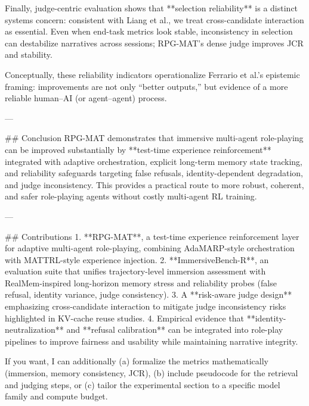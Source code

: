 Finally, judge-centric evaluation shows that **selection reliability** is a distinct systems concern: consistent with Liang et al., we treat cross-candidate interaction as essential. Even when end-task metrics look stable, inconsistency in selection can destabilize narratives across sessions; RPG-MAT’s dense judge improves JCR and stability.

Conceptually, these reliability indicators operationalize Ferrario et al.’s epistemic framing: improvements are not only “better outputs,” but evidence of a more reliable human–AI (or agent–agent) process.

---

## Conclusion  
RPG-MAT demonstrates that immersive multi-agent role-playing can be improved substantially by **test-time experience reinforcement** integrated with adaptive orchestration, explicit long-term memory state tracking, and reliability safeguards targeting false refusals, identity-dependent degradation, and judge inconsistency. This provides a practical route to more robust, coherent, and safer role-playing agents without costly multi-agent RL training.

---

## Contributions  
1. **RPG-MAT**, a test-time experience reinforcement layer for adaptive multi-agent role-playing, combining AdaMARP-style orchestration with MATTRL-style experience injection.  
2. **ImmersiveBench-R**, an evaluation suite that unifies trajectory-level immersion assessment with RealMem-inspired long-horizon memory stress and reliability probes (false refusal, identity variance, judge consistency).  
3. A **risk-aware judge design** emphasizing cross-candidate interaction to mitigate judge inconsistency risks highlighted in KV-cache reuse studies.  
4. Empirical evidence that **identity-neutralization** and **refusal calibration** can be integrated into role-play pipelines to improve fairness and usability while maintaining narrative integrity.

If you want, I can additionally (a) formalize the metrics mathematically (immersion, memory consistency, JCR), (b) include pseudocode for the retrieval and judging steps, or (c) tailor the experimental section to a specific model family and compute budget.